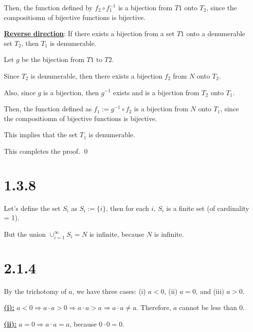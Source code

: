 \documentclass{article}
\begin{document}
\noindent
Then, the function defined by $f_2 \circ f_1^{-1}$ is a bijection from $T1$ onto $T_2$, since the compositiomn of bijective functions is bijective.
\newline

\noindent
\textbf{\underline{Reverse direction}}: If there exists a bijection from a set $T1$ onto a denumerable set $T_2$, then $T_1$ is denumerable.
\newline

\noindent
Let $g$ be the bijection from $T1$ to $T2$.

\noindent
Since $T_2$ is denumerable, then there exists a bijection $f_2$ from $N$ onto $T_2$.

\noindent
Also, since $g$ is a bijection, then $g^{-1}$ exists and is a bijection from $T_2$ onto $T_1$.

\noindent
Then, the function defined as $f_1 := g^{-1} \circ f_2$ is a bijection from $N$ onto $T_1$, since the compositiomn of bijective functions is bijective.

\noindent
This implies that the set $T_1$ is denumerable.
\newline

\noindent
This completes the proof.
\qed

\section*{1.3.8}
Let's define the set $S_i$ as $S_i:=\{i\}$, then for each $i$, $S_i$ is a finite set (of cardinality = 1). 

\noindent
But the union $\cup_{i=1}^{\infty}S_i = N$ is infinite, because $N$ is infinite.
\newline

\section*{2.1.4}
By the trichotomy of $a$, we have three cases: (i) $a < 0$, (ii) $a = 0$, and (iii) $a > 0$.
\newline

\noindent
\textbf{\underline{(i):}} $a<0 \Rightarrow a \cdot a > 0 \Rightarrow a \cdot a > a \Rightarrow a \cdot a \not= a$. Therefore, $a$ cannot be less than 0.
\newline

\noindent
\textbf{\underline{(ii):}} $a=0 \Rightarrow a \cdot a = a$, because $0 \cdot 0 = 0$.
\newline
\end{document}

